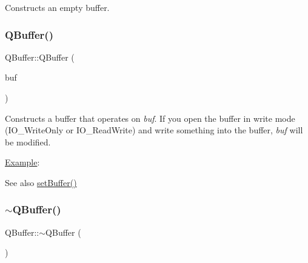 Constructs an empty buffer. \mbox{\label{class_q_buffer_ac88f81ed56581532b835e83812a8650a}} 
\subsubsection{\texorpdfstring{QBuffer()}{QBuffer()}\hspace{0.1cm}{\footnotesize\ttfamily [2/2]}}
{\footnotesize\ttfamily Q\+Buffer\+::\+Q\+Buffer (\begin{DoxyParamCaption}\item[{\mbox{\hyperlink{class_q_array}{Q\+Byte\+Array}}}]{buf }\end{DoxyParamCaption})}

Constructs a buffer that operates on {\itshape buf}. If you open the buffer in write mode ({\ttfamily I\+O\+\_\+\+Write\+Only} or {\ttfamily I\+O\+\_\+\+Read\+Write}) and write something into the buffer, {\itshape buf} will be modified.

\mbox{\hyperlink{struct_example}{Example}}\+: 
\begin{DoxyCode}{0}
\DoxyCodeLine{  \textcolor{comment}{// Now, str == "abcdef"}}
\end{DoxyCode}


\begin{DoxySeeAlso}{See also}
\mbox{\hyperlink{class_q_buffer_ad4c608788c2730ca60295488f75da423}{set\+Buffer()}} 
\end{DoxySeeAlso}
\mbox{\label{class_q_buffer_a23e9bc1bae06f2c96e456d6b5ca1b52d}} 
\subsubsection{\texorpdfstring{$\sim$QBuffer()}{~QBuffer()}}
{\footnotesize\ttfamily Q\+Buffer\+::$\sim$\+Q\+Buffer (\begin{DoxyParamCaption}{ }\end{DoxyParamCaption})}


